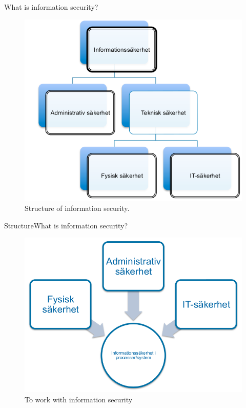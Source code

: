 \documentclass{beamer}
\begin{document}
\begin{frame}{What is information security?}
  \begin{figure}
    \includegraphics[height=0.7\textheight]{Figures/infosak-struktur.png}
    \caption{Structure of information security.}
  \end{figure}
\end{frame}

\begin{frame}{Structure}{What is information security?}
  \begin{figure}
    \includegraphics[height=0.7\textheight]{Figures/infosak-process.png}
    \caption{To work with information security}
  \end{figure}
\end{frame}
\end{document}
